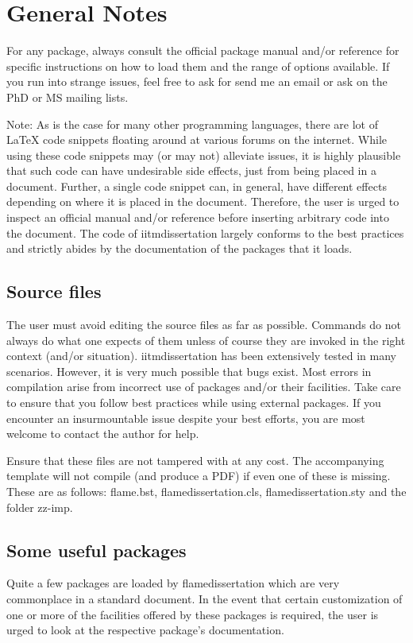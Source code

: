 \chapter{General Notes}
For any package, always consult the official package manual and/or reference
for specific instructions on how to load them and the range of options
available. If you run into strange issues, feel free to ask for send
me an email or ask on the PhD or MS mailing lists.

{Note:} As is the case for many other programming languages, there are
lot of {\LaTeX} code snippets floating around at various forums on the
internet. While using these code snippets may (or may not) alleviate issues,
it is highly plausible that such code can have undesirable side effects, just
from being placed in a document. Further, a single code snippet can, in general,
have different effects depending on where it is placed in the document.
Therefore, the user is urged to inspect an official manual and/or reference
before inserting arbitrary code into the document. The code of
{iitmdissertation} largely conforms to the best practices and strictly
abides by the documentation of the packages that it loads.

\section{Source files} \label{sec:source-files}
The user must avoid editing the source files as far as possible. Commands do
not always do what one expects of them unless of course they are invoked in the
right context (and/or situation). {\ttfamily iitmdissertation} has been extensively
tested in many scenarios. However, it is very much possible that bugs exist.
Most errors in compilation arise from incorrect use of packages and/or their
facilities. Take care to ensure that you follow best practices while using
external packages. If you encounter an insurmountable issue despite your best
efforts, you are most welcome to contact the author for help.

Ensure that these files are not tampered with at any cost. The accompanying
template will not compile (and produce a PDF) if even one of these is missing. 
These are as follows: {\ttfamily flame.bst}, {\ttfamily flamedissertation.cls}, 
{\ttfamily flamedissertation.sty} and the folder {\ttfamily zz-imp}.

\section{Some useful packages}
Quite a few packages are loaded by {flamedissertation} which are very
commonplace in a standard document. In the event that certain customization of
one or more of the facilities offered by these packages is required, the user
is urged to look at the respective package's documentation.

